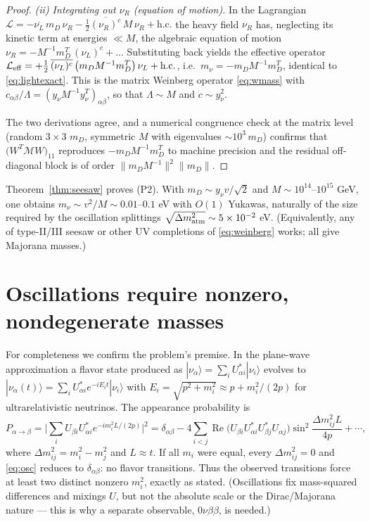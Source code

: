 \documentclass[12pt]{article}
\theoremstyle{definition}
\newcommand{\nuL}{\nu_L}
\newcommand{\nuR}{\nu_R}
\begin{document}
\begin{proof}
\smallskip
\emph{(ii) Integrating out $\nuR$ (equation of motion).}
In the Lagrangian
$\mathcal L=-\overline{\nuL}\,m_D\,\nuR
-\tfrac12\overline{(\nuR)^c}\,M\,\nuR+\text{h.c.}$
the heavy field $\nuR$ has, neglecting its kinetic term at energies
$\ll M$, the algebraic equation of motion
$\nuR=-M^{-1}m_D^T\,(\nuL)^c+\dots$ Substituting back yields the effective
operator
$\mathcal L_{\rm eff}=+\tfrac12\,\overline{(\nuL)^c}\,
\big(m_DM^{-1}m_D^T\big)\,\nuL+\text{h.c.}$,
i.e.\ $m_\nu=-m_DM^{-1}m_D^T$, identical to \eqref{eq:lightexact}. This is
the matrix Weinberg operator \eqref{eq:wmass} with
$c_{\alpha\beta}/\Lambda=(y_\nu M^{-1}y_\nu^T)_{\alpha\beta}$, so that
$\Lambda\sim M$ and $c\sim y_\nu^2$.

\smallskip
The two derivations agree, and a numerical congruence check at the
matrix level (random $3\times3$ $m_D$, symmetric $M$ with eigenvalues
$\sim10^3\,m_D$) confirms that $\big(W^T\mathcal M W\big)_{11}$ reproduces
$-m_DM^{-1}m_D^T$ to machine precision and the residual off-diagonal block
is of order $\|m_DM^{-1}\|^2\|m_D\|$.
\end{proof}

Theorem~\ref{thm:seesaw} proves (P2). With
$m_D\sim y_\nu v/\sqrt2$ and $M\sim10^{14}$--$10^{15}$ GeV, one obtains
$m_\nu\sim v^2/M\sim0.01$--$0.1$ eV with $O(1)$ Yukawas, naturally of the
size required by the oscillation splittings $\sqrt{\Delta m^2_{\rm atm}}
\sim5\times10^{-2}$ eV. (Equivalently, any of type-II/III seesaw or other
UV completions of \eqref{eq:weinberg} works; all give Majorana masses.)

\section{Oscillations require nonzero, nondegenerate masses}

For completeness we confirm the problem's premise. In the plane-wave
approximation a flavor state produced as
$|\nu_\alpha\rangle=\sum_i U^*_{\alpha i}|\nu_i\rangle$ evolves to
$|\nu_\alpha(t)\rangle=\sum_i U^*_{\alpha i}e^{-iE_it}|\nu_i\rangle$ with
$E_i=\sqrt{p^2+m_i^2}\approx p+m_i^2/(2p)$ for ultrarelativistic
neutrinos. The appearance probability is
\begin{equation}\label{eq:osc}
P_{\alpha\to\beta}=\Big|\sum_i U_{\beta i}U^*_{\alpha i}
e^{-i m_i^2 L/(2p)}\Big|^2
=\delta_{\alpha\beta}
-4\!\!\sum_{i<j}\!\operatorname{Re}\!\big(U_{\beta i}U^*_{\alpha i}
U^*_{\beta j}U_{\alpha j}\big)\sin^2\!\frac{\Delta m^2_{ij}L}{4p}+\cdots,
\end{equation}
where $\Delta m^2_{ij}=m_i^2-m_j^2$ and $L\approx t$. If all
$m_i$ were equal, every $\Delta m^2_{ij}=0$ and
\eqref{eq:osc} reduces to $\delta_{\alpha\beta}$: no flavor transitions.
Thus the observed transitions force at least two distinct nonzero
$m_i^2$, exactly as stated. (Oscillations fix mass-squared differences and
mixings $U$, but not the absolute scale or the Dirac/Majorana nature ---
this is why a separate observable, $0\nu\beta\beta$, is needed.)
\end{document}
